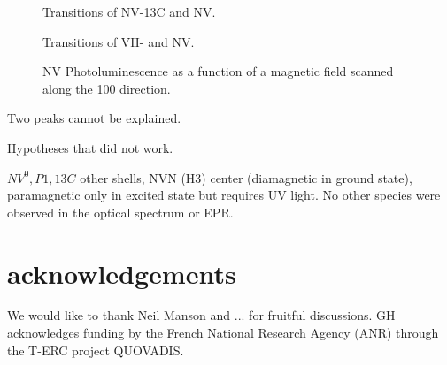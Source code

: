 \documentclass[preprintnumbers,amsmath,amssymb,twocolumn]{revtex4-1}
\begin{document}
\begin{figure}[!ht]
  \caption{Transitions of NV-13C and NV.
 }
\end{figure}
\begin{figure}[!ht]
  \caption{Transitions of VH- and NV.
 }
\end{figure}
\begin{figure}[!ht]
  \caption{NV Photoluminescence as a function of a magnetic field scanned along the 100 direction. 
 }
\end{figure}

Two peaks cannot be explained. 

Hypotheses that did not work.


$NV^0, P1, 13C$ other shells, NVN (H3) center (diamagnetic in ground state), paramagnetic only in excited state but requires UV light. 
No other species were observed in the optical spectrum or EPR. 












\section*{acknowledgements}
We would like to thank Neil Manson and ... for fruitful discussions. 
GH acknowledges funding by the French National Research Agency (ANR) through the T-ERC project QUOVADIS. 


\end{document}
